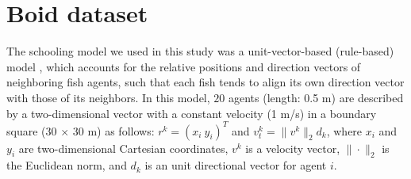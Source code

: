 \documentclass[journal]{IEEEtran}
\begin{document}
\section{Boid dataset}
\label{app:boid}
The schooling model we used in this study was a unit-vector-based (rule-based) model \cite{Couzin02}, which accounts for the relative positions and direction vectors of neighboring fish agents, such that each fish tends to align its own direction vector with those of its neighbors. 
In this model, $20$ agents (length: 0.5 m) are described by a two-dimensional vector with a constant velocity (1 m/s) in a boundary square (30 $\times$ 30 m) as follows: 
${r}^k=\left({x_i}~{y_i}\right)^T$ and ${v}^k_t= \|v^k\|_2d_k$, where $x_i$ and $y_i$ are two-dimensional Cartesian coordinates, ${v}^k$ is a velocity vector, $\|\cdot\|_2$ is the Euclidean norm, and $d_k$ is an unit directional vector for agent $i$.
\end{document}
